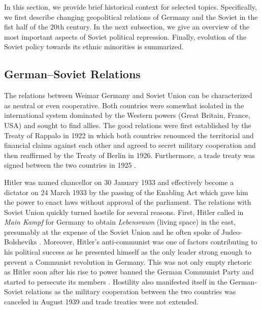 In this section, we provide brief historical context for selected topics. Specifically, we first describe  changing geopolitical relations of Germany and the Soviet in the fist half of the 20th century. In the next subsection, we give an overview of the most important aspects of Soviet political repression. Finally, evolution of the Soviet policy towards its ethnic minorities is summarized.   
\subsection{German–Soviet Relations} \label{subsec:relations}
The relations between Weimar Germany and Soviet Union can be characterized as neutral or even cooperative. Both countries were somewhat isolated in the international system dominated by the Western powers (Great Britain, France, USA) and sought to find allies. The good relations were first established by the Treaty of Rappalo in 1922 in which both countries renounced the territorial and financial claims against each other and agreed to secret military cooperation \citep{gatzke_russo-german_1958} and then reaffirmed by the Treaty of Berlin in 1926. Furthermore, a trade treaty was signed between the two countries in 1925 \citep{morgan_political_1963}.

Hitler was named chancellor on 30 January 1933 and effectively become a dictator on 24 March 1933 by the passing of the Enabling Act which gave him the power to enact laws without  approval of the parliament. 
The relations with Soviet Union quickly turned hostile for several reasons.  First, Hitler called in \emph{Main Kampf} for Germany to obtain \emph{Lebensraum} (living space) in the east, presumably at the expense of the Soviet Union and he often spoke of Judeo-Bolsheviks \citep[p. 6]{haslam_soviet_1984}. Moreover, Hitler's anti-communist was one of factors contributing to his political success as he presented himself as the only leader strong enough to  prevent a Communist revolution in Germany. This was not only empty rhetoric as Hitler soon after his rise to power banned the German Communist Party and started to persecute its members \citep[chapter 5]{evans_coming_2004}. Hostility also manifested itself in the German-Soviet relations as the military cooperation between the two countries was canceled in August 1939 and trade treaties were not extended.  

